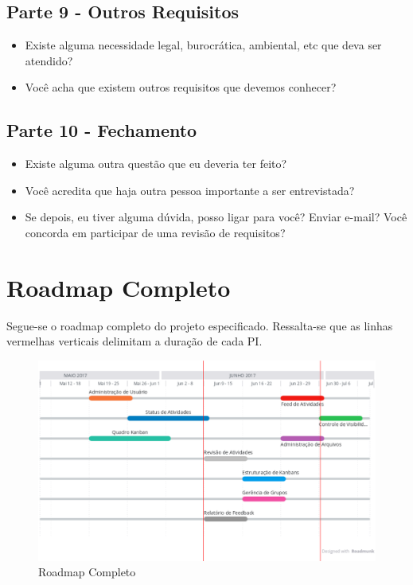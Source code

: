 \begin{anexosenv}
\section{Parte 9 - Outros Requisitos}
\begin{itemize}
  \item Existe alguma necessidade legal, burocrática, ambiental, etc que deva ser atendido?
  \item Você acha que existem outros requisitos que devemos conhecer?
\end{itemize}

\section{Parte 10 - Fechamento}
\begin{itemize}
  \item Existe alguma outra questão que eu deveria ter feito?
  \item Você acredita que haja outra pessoa importante a ser entrevistada?
  \item Se depois, eu tiver alguma dúvida, posso ligar para você? Enviar e-mail? Você concorda em participar de uma revisão de requisitos?
\end{itemize}

\chapter{Roadmap Completo}
\label{annex:roadmap}

Segue-se o roadmap completo do projeto especificado. Ressalta-se que as linhas vermelhas verticais delimitam
a duração de cada PI.

\begin{figure}[!h]
        \centering
        \includegraphics[keepaspectratio=true,scale=0.6]{figuras/roadmap.eps}
        \caption{Roadmap Completo}
\end{figure}


\end{anexosenv}
